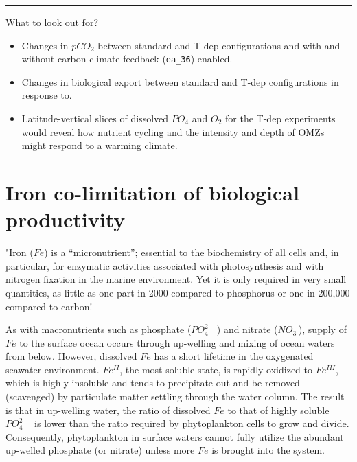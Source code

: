 \vspace{1mm} \noindent\rule{4cm}{0.1mm} \vspace{2mm}

\noindent What to look out for?

\begin{itemize}[noitemsep]
\vspace{1mm}
\item Changes in $pCO_{2}$ between standard and T-dep configurations and with and without carbon-climate feedback (\texttt{\small ea\_36}) enabled.
\vspace{1mm}
\item Changes in biological export between standard and T-dep configurations in response to.
\vspace{1mm}
\item Latitude-vertical slices of dissolved $PO_{4}$ and $O_{2}$ for the T-dep experiments would reveal how nutrient cycling and the intensity and depth of OMZs might respond to a warming climate. 
\end{itemize}

\newpage

\section{Iron co-limitation of biological productivity}

"Iron (\(Fe\)) is a “micronutrient”; essential to the biochemistry of all cells and, in particular, for enzymatic activities associated with photosynthesis and with nitrogen fixation in the marine environment. Yet it is only required in very small quantities, as little as one part in 2000 compared to phosphorus
or one in 200,000 compared to carbon! 

As with macronutrients such as phosphate (\(PO^{2-}_{4}\)) and nitrate (\(NO^{-}_{3}\)), supply of \(Fe\) to the surface ocean occurs through up-welling and mixing of ocean waters from below. However, dissolved \(Fe\) has a short lifetime in the oxygenated seawater environment. \(Fe^{II}\), the most soluble state, is rapidly oxidized to \(Fe^{III}\), which is highly insoluble and tends to precipitate out and be removed (scavenged) by particulate matter settling through the water column. The result is that in up-welling water, the ratio of dissolved \(Fe\) to that of highly soluble \(PO^{2-}_{4}\) is lower than the ratio required by phytoplankton cells to grow and divide. Consequently, phytoplankton in surface waters cannot fully utilize the abundant up-welled
phosphate (or nitrate) unless more \(Fe\) is brought into the system.

